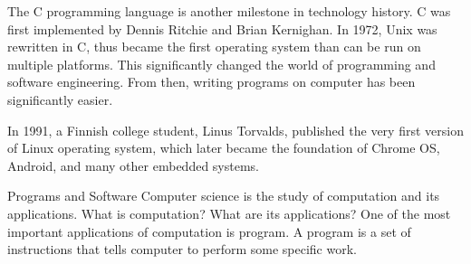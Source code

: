 \documentclass[../main.tex]{subfiles}
\begin{document}
    The C programming language is another milestone in technology history. C was
    first implemented by Dennis Ritchie and Brian Kernighan. In 1972, Unix was
    rewritten in C, thus became the first operating system than can be run on
    multiple platforms. This significantly changed the world of programming and
    software engineering. From then, writing programs on computer has been
    significantly easier.

    In 1991, a Finnish college student, Linus Torvalds, published the very first
    version of Linux operating system, which later became the foundation of Chrome
    OS, Android, and many other embedded systems.

    Programs and Software
    Computer science is the study of computation and its applications. What is
    computation? What are its applications? One of the most important applications
    of computation is program. A program is a set of instructions that tells computer
    to perform some specific work.
\end{document}
